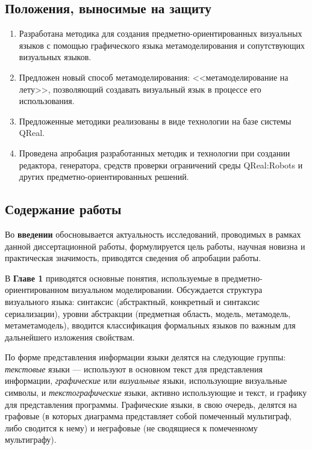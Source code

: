 \subsection*{\Large Положения, выносимые на защиту}
\begin{enumerate}
	\item Разработана методика для создания предметно-ориентированных визуальных языков с помощью 
		графического языка метамоделирования и сопутствующих визуальных языков.
	\item Предложен новый способ метамоделирования: <<метамоделирование на лету>>, позволяющий
		создавать визуальный язык в процессе его использования.
	\item Предложенные методики реализованы в виде технологии на базе системы QReal.
	\item Проведена апробация разработанных методик и технологии при создании редактора, 
		генератора, средств проверки ограничений среды QReal:Robots и других предметно-ориентированных 
		решений.
\end{enumerate}

\subsection*{\Large Содержание работы}
Во \textbf{введении} обосновывается актуальность исследований, проводимых в рамках 
данной диссертационной работы, формулируется цель работы, научная новизна и практическая 
значимость, приводятся сведения об апробации работы.

В \textbf{Главе 1} приводятся основные понятия, используемые в 
предметно-ориентированном визуальном моделировании. Обсуждается структура 
визуального языка: синтаксис (абстрактный, конкретный и синтаксис сериализации), 
уровни абстракции (предметная область, модель, метамодель, метаметамодель), вводится 
классификация формальных языков по важным для дальнейшего изложения свойствам.

По форме представления информации языки делятся на следующие группы: \textit{текстовые} языки 
--- используют в основном текст для представления информации, \textit{графические} или 
\textit{визуальные} языки, использующие визуальные символы, и \textit{текстографические} языки,
активно использующие и текст, и графику для представления программы. Графические языки, в свою очередь, 
делятся на графовые (в которых диаграмма представляет собой помеченный мультиграф, либо сводится к нему)
и неграфовые (не сводящиеся к помеченному мультиграфу).

